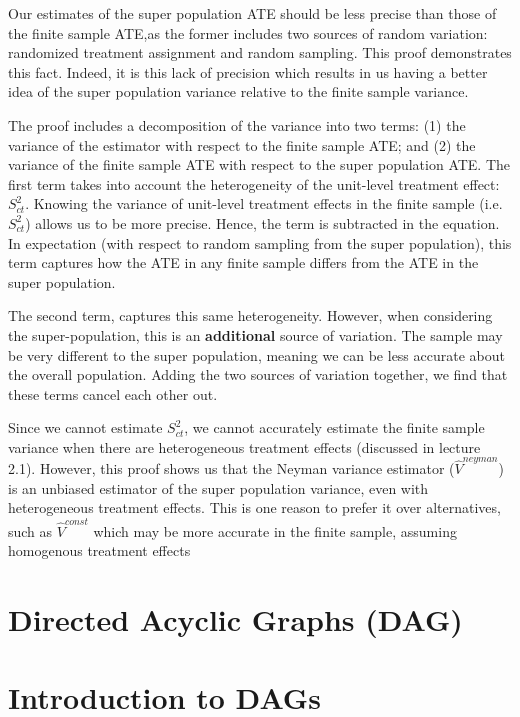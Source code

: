 \documentclass[
  letterpaper,
  DIV=11,
  numbers=noendperiod]{scrreprt}
\theoremstyle{definition}
\theoremstyle{remark}
\begin{document}
Our estimates of the super population ATE should be less precise than
those of the finite sample ATE,as the former includes two sources of
random variation: randomized treatment assignment and random sampling.
This proof demonstrates this fact. Indeed, it is this lack of precision
which results in us having a better idea of the super population
variance relative to the finite sample variance.

The proof includes a decomposition of the variance into two terms: (1)
the variance of the estimator with respect to the finite sample ATE; and
(2) the variance of the finite sample ATE with respect to the super
population ATE. The first term takes into account the heterogeneity of
the unit-level treatment effect: \(S^2_{ct}\). Knowing the variance of
unit-level treatment effects in the finite sample (i.e.~\(S^2_{ct}\))
allows us to be more precise. Hence, the term is subtracted in the
equation. In expectation (with respect to random sampling from the super
population), this term captures how the ATE in any finite sample differs
from the ATE in the super population.

The second term, captures this same heterogeneity. However, when
considering the super-population, this is an \textbf{additional} source
of variation. The sample may be very different to the super population,
meaning we can be less accurate about the overall population. Adding the
two sources of variation together, we find that these terms cancel each
other out.

Since we cannot estimate \(S^2_{ct}\), we cannot accurately estimate the
finite sample variance when there are heterogeneous treatment effects
(discussed in lecture 2.1). However, this proof shows us that the Neyman
variance estimator (\(\hat{V}^{neyman}\)) is an unbiased estimator of
the super population variance, even with heterogeneous treatment
effects. This is one reason to prefer it over alternatives, such as
\(\hat{V}^{const}\) which may be more accurate in the finite sample,
assuming homogenous treatment effects

\chapter{Directed Acyclic Graphs
(DAG)}\label{directed-acyclic-graphs-dag}

\chapter{Introduction to DAGs}\label{introduction-to-dags}
\end{document}
